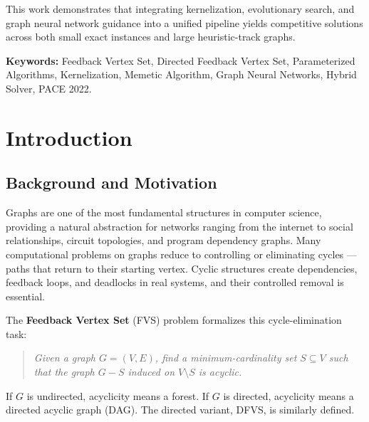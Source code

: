 \documentclass[10pt,a4paper]{report}
\theoremstyle{definition}
\newcommand{\fvs}{\textsc{FVS}}
\newcommand{\dfvs}{\textsc{DFVS}}
\begin{document}
This work demonstrates that integrating kernelization, evolutionary search, and graph neural network guidance into a unified pipeline yields competitive solutions across both small exact instances and large heuristic-track graphs.

\vspace{1cm}
\textbf{Keywords:} Feedback Vertex Set, Directed Feedback Vertex Set, Parameterized Algorithms, Kernelization, Memetic Algorithm, Graph Neural Networks, Hybrid Solver, PACE 2022.

\begingroup
\let\clearpage\relax
\let\cleardoublepage\relax
\tableofcontents
\listoffigures
\listoftables
\endgroup

\chapter{Introduction}

\section{Background and Motivation}

Graphs are one of the most fundamental structures in computer science, providing a natural abstraction for networks ranging from the internet to social relationships, circuit topologies, and program dependency graphs.
Many computational problems on graphs reduce to controlling or eliminating cycles --- paths that return to their starting vertex.
Cyclic structures create dependencies, feedback loops, and deadlocks in real systems, and their controlled removal is essential.

The \textbf{Feedback Vertex Set} (\fvs{}) problem formalizes this cycle-elimination task:
\begin{quote}
	\textit{Given a graph $G = (V, E)$, find a minimum-cardinality set $S \subseteq V$ such that the graph $G - S$ induced on $V \setminus S$ is acyclic.}
\end{quote}

If $G$ is undirected, acyclicity means a forest. If $G$ is directed, acyclicity means a directed acyclic graph (DAG). The directed variant, \dfvs{}, is similarly defined.
\end{document}
